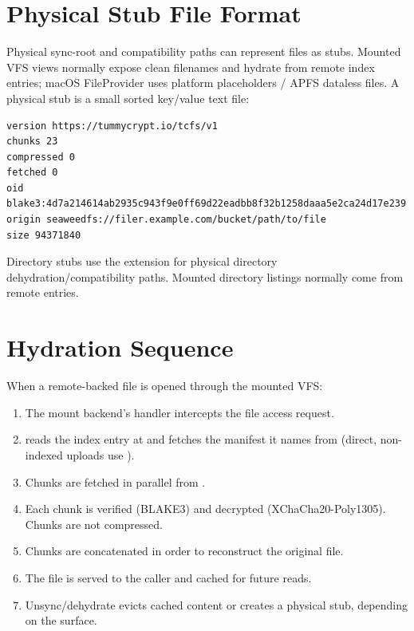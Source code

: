\documentclass[11pt,a4paper]{article}
\begin{document}
\section{Physical Stub File Format}

Physical sync-root and compatibility paths can represent files as 
stubs. Mounted VFS views normally expose clean filenames and hydrate from remote
index entries; macOS FileProvider uses platform placeholders / APFS dataless
files. A physical  stub is a small sorted key/value text file:

\begin{lstlisting}
version https://tummycrypt.io/tcfs/v1
chunks 23
compressed 0
fetched 0
oid blake3:4d7a214614ab2935c943f9e0ff69d22eadbb8f32b1258daaa5e2ca24d17e239
origin seaweedfs://filer.example.com/bucket/path/to/file
size 94371840
\end{lstlisting}

Directory stubs use the  extension for physical directory
dehydration/compatibility paths. Mounted directory listings normally come from
remote  entries.

\section{Hydration Sequence}

When a remote-backed file is opened through the mounted VFS:

\begin{enumerate}
  \item The mount backend's  handler intercepts the file access
        request.
  \item \tcfsd{} reads the index entry at
         and fetches the manifest it
        names from 
        (direct, non-indexed uploads use
        ).
  \item Chunks are fetched in parallel from
        .
  \item Each chunk is verified (BLAKE3) and decrypted (XChaCha20-Poly1305).
        Chunks are not compressed.
  \item Chunks are concatenated in order to reconstruct the original file.
  \item The file is served to the caller and cached for future reads.
  \item Unsync/dehydrate evicts cached content or creates a physical
         stub, depending on the surface.
\end{enumerate}
\end{document}
